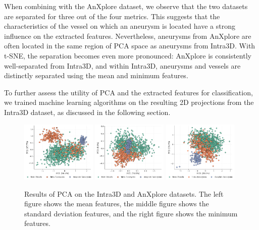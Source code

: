 \documentclass[%
 reprint,
 amsmath,amssymb,
 aps,
 floatfix,
 nofootinbib,
]{revtex4-2}
\begin{document}
When combining with the AnXplore dataset, we observe that the two datasets are separated for three out of the four metrics. This suggests that the characteristics of the vessel on which an aneurysm is located have a strong influence on the extracted features. Nevertheless, aneurysms from AnXplore are often located in the same region of PCA space as aneurysms from Intra3D. With t-SNE, the separation becomes even more pronounced: AnXplore is consistently well-separated from Intra3D, and within Intra3D, aneurysms and vessels are distinctly separated using the mean and minimum features.

To further assess the utility of PCA and the extracted features for classification, we trained machine learning algorithms on the resulting 2D projections from the Intra3D dataset, as discussed in the following section.

\begin{figure}
  \centering
  \includegraphics[width=0.32\textwidth]{pca_mean.png}
  \includegraphics[width=0.32\textwidth]{pca_std.png}
  \includegraphics[width=0.32\textwidth]{pca_min.png}
  \caption{Results of PCA on the Intra3D and AnXplore datasets. The left figure shows the mean features, the middle figure shows the standard deviation features, and the right figure shows the minimum features.}
  \label{fig:pca}
\end{figure}
\end{document}
